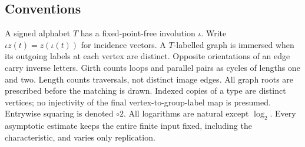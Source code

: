 \subsection{Conventions}
A signed alphabet $T$ has a fixed-point-free involution $\iota$. Write $\iota z(t)=z(\iota(t))$ for incidence vectors. A $T$-labelled graph is immersed when its outgoing labels at each vertex are distinct. Opposite orientations of an edge carry inverse letters. Girth counts loops and parallel pairs as cycles of lengths one and two. Length counts traversals, not distinct image edges. All graph roots are prescribed before the matching is drawn. Indexed copies of a type are distinct vertices; no injectivity of the final vertex-to-group-label map is presumed. Entrywise squaring is denoted $\circ2$. All logarithms are natural except $\log_2$. Every asymptotic estimate keeps the entire finite input fixed, including the characteristic, and varies only replication.
